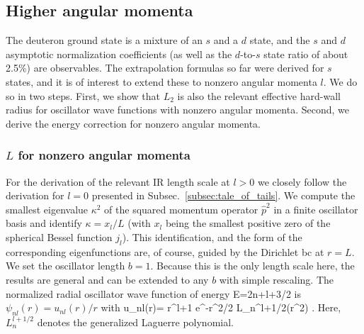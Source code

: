 	\subsection{Higher angular momenta}
	\label{subsec:higher_angular_momenta}

	The deuteron ground state is a mixture of an $s$ and a $d$ state, and
	the $s$ and $d$ asymptotic normalization coefficients (as well as the
	$d$-to-$s$ state ratio of about 2.5\%) are observables.  The
	extrapolation formulas so far were derived for $s$
	states, and it is of interest to extend these to nonzero angular
	momenta $l$.  We do so in two steps.  First, we show that $L_2$ is also
	the relevant effective hard-wall radius for oscillator wave functions
	with nonzero angular momenta.  Second, we derive the energy correction
	for nonzero angular momenta.

	\medskip
	\subsubsection{$L$ for nonzero angular momenta}

	For the derivation of the relevant IR length scale at $l>0$ we closely
	follow the derivation for $l=0$ presented in
	Subsec.~\ref{subsec:tale_of_tails}.  We compute the smallest eigenvalue
	$\kappa^2$ of the squared momentum operator $\hat{p}^2$ in a finite
	oscillator basis and identify $\kappa =x_l/L$ (with $x_l$ being the
	smallest positive zero of the spherical Bessel function $j_l$). This
	identification, and the form of the corresponding eigenfunctions are,
	of course, guided by the Dirichlet bc at $r=L$.  We set the oscillator
	length $b=1$.  Because this is the only length scale here, the results
	are general and can be extended to any $b$ with simple rescaling.
	The normalized radial	oscillator wave function of energy
	\beq
	  E=2n+l+3/2
	\eeq
	is   $\psi_{nl}(r)=u_{nl}(r)/r$ with
	\beq
	u_{nl}(r)= r^{l+1} e^{-r^2/2}
	L_{n}^{l+1/2}(r^2) \;.
	\eeq
	Here, $L_n^{l+1/2}$ denotes the generalized Laguerre polynomial.

